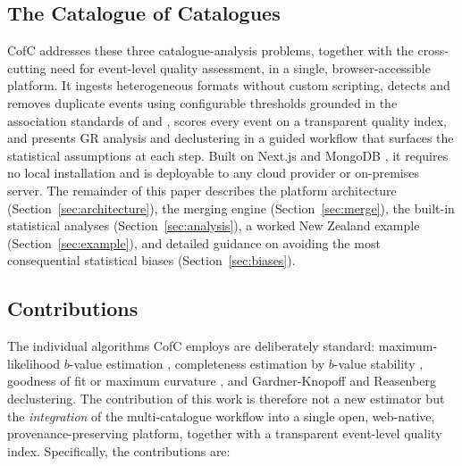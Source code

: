 \documentclass[12pt]{article}
\begin{document}
\subsection{The Catalogue of Catalogues}

CofC addresses these three catalogue-analysis problems, together with the
cross-cutting need for event-level quality assessment, in a single,
browser-accessible platform.  It ingests heterogeneous formats without
custom scripting, detects and removes duplicate events using configurable
thresholds grounded in the association standards of \citet{storchak2013}
and \citet{engdahl1998}, scores every event on a transparent quality index,
and presents GR analysis and declustering in a guided workflow that surfaces
the statistical assumptions at each step.  Built on Next.js
\citep{nextjs2024} and MongoDB \citep{mongodb2024}, it requires no local
installation and is deployable to any cloud provider or on-premises server.
The remainder of this paper describes the platform architecture
(Section~\ref{sec:architecture}), the merging engine
(Section~\ref{sec:merge}), the built-in statistical analyses
(Section~\ref{sec:analysis}), a worked New Zealand example
(Section~\ref{sec:example}), and detailed guidance on avoiding the most
consequential statistical biases (Section~\ref{sec:biases}).

\subsection{Contributions}
\label{sec:contributions}

The individual algorithms CofC employs are deliberately standard: maximum-likelihood
$b$-value estimation \citep{aki1965,utsu1965}, completeness estimation by $b$-value
stability \citep{caogao2002,woessner2005}, goodness of fit or maximum curvature
\citep{wiemer2000}, and Gardner-Knopoff \citep{gardner1974} and Reasenberg
\citep{reasenberg1985} declustering.  The contribution of this work is therefore not
a new estimator but the \emph{integration} of the multi-catalogue
workflow into a single open, web-native, provenance-preserving platform,
together with a transparent event-level quality index.  Specifically, the
contributions are:
\end{document}

